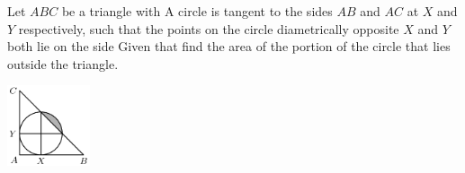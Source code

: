 Let $ ABC$ be a triangle with   A circle is tangent to the sides $ AB$ and $ AC$ at $ X$ and $ Y$ respectively, such that the points on the circle diametrically opposite $ X$ and $ Y$ both lie on the side  Given that  find the area of the portion of the circle that lies outside the triangle.

\begin{center}
\includegraphics[width = 24.400000000000002mm]{img/fig0.png}
\end{center}